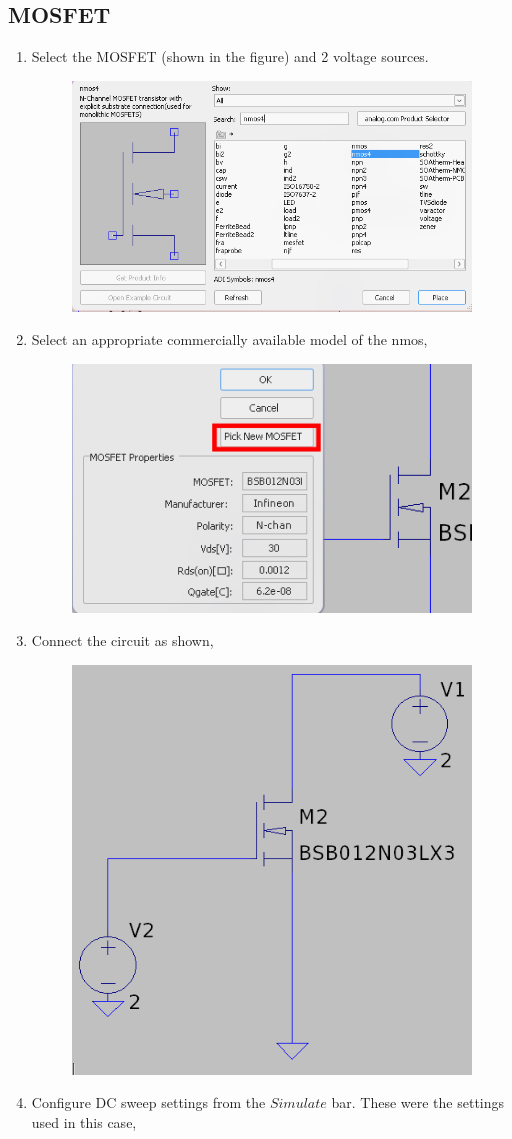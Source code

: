 \documentclass[12pt,a4paper]{report}
\begin{document}
\subsection{MOSFET}
\begin{enumerate}
    \item Select the MOSFET (shown in the figure) and 2 voltage sources.
    \begin{figure}[h!]
        \centering
        \includegraphics[width = 0.6\linewidth]{figs/component-nmos.png}
        \label{fig:placeholder}
    \end{figure}
    \item Select an appropriate commercially available model of the nmos,
    \begin{figure}[h!]
        \centering
        \includegraphics[width=0.5\linewidth]{figs/mosfet-model.png}
        \label{fig:placeholder}
    \end{figure}
    \item Connect the circuit as shown,
    \pagebreak
    \begin{figure}[h!]
        \centering
        \includegraphics[width=0.5\linewidth]{figs/mosfet-circuit.png}
        \label{fig:placeholder}
    \end{figure}
    \item Configure DC sweep settings from the $Simulate$ bar. These were the settings used in this case,
  \begin{figure}[h!]
  \centering
  

\end{figure}
\end{enumerate}
\end{document}

